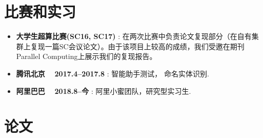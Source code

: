 \documentclass[letterpaper]{article}
\begin{document}
\section*{比赛和实习}
\begin{itemize}
  \item \textbf{大学生超算比赛(SC16, SC17)} : 在两次比赛中负责论文复现部分（在自有集群上复现一篇SC会议论文）。由于该项目上较高的成绩，我们受邀在期刊Parallel Computing上展示我们的复现报告。
  \item \textbf{腾讯北京 ~ 2017.4--2017.8} : 智能助手测试， 命名实体识别.
  \item \textbf{阿里巴巴 ~ 2018.8--今} : 阿里小蜜团队，研究型实习生.
\end{itemize}


\section*{论文}
\end{document}
